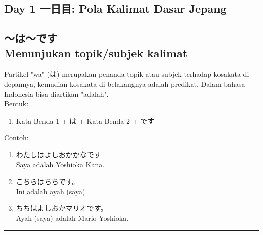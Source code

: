 \begin{flushright}
    \section*{\Large{Day 1 一日目: Pola Kalimat Dasar Jepang}}
\end{flushright}

\subsection*{
    ～は～です \\ 
    Menunjukan topik/subjek kalimat
}
Partikel "wa" (は) merupakan penanda topik atau subjek terhadap kosakata di depannya, kemudian
kosakata di belakangnya adalah predikat. Dalam bahasa Indonesia bisa diartikan "adalah".\\
Bentuk:
\begin{enumerate}
    \item Kata Benda 1 + は + Kata Benda 2 + です
\end{enumerate}
Contoh: 
\begin{enumerate}
    \item わたしはよしおかかなです
    \\ Saya adalah Yoshioka Kana.
    \item こちらはちちです。
    \\ Ini adalah ayah (saya).
    \item ちちはよしおかマリオです。
    \\ Ayah (saya) adalah Mario Yoshioka.
\end{enumerate}

\vspace{0.2cm}\hrule height 1pt\vspace{0.2cm}


